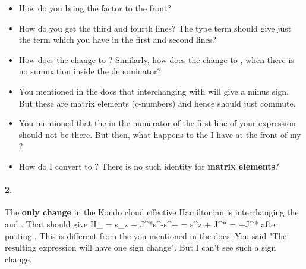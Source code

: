 \documentclass[12pt]{article}
\numberwithin{equation}{section}
\begin{document}
\begin{itemize}
	\item How do you bring the  factor to the front?\\
	\item How do you get the third and fourth lines? The  type term should give just the  term which you have in the first and second lines?\\
	\item How does the  change to ? Similarly, how does the  change to , when there is no summation inside the denominator?\\
	\item You mentioned in the docs that interchanging  with  will give a minus sign. But these are matrix elements (c-numbers) and hence should just commute.\\
	\item You mentioned that the  in the numerator of the first line of your expression should not be there. But then, what happens to the  I have at the front of my \il{\Delta \ham}?\\
	\item How do I convert  to ? There is no such identity for \textbf{matrix elements}?
\end{itemize}
\pagebreak
\paragraph{2.}
The \textbf{only change} in the Kondo cloud effective Hamiltonian is interchanging the  and . That should give
\beq
H_ = s_z + J^*s^-s^+ = s^z + J^* = +J^*
\eeq
after putting . This is different from the  you mentioned in the docs. You said "The resulting expression will have one sign change". But I can't see such a sign change.
\end{document}
